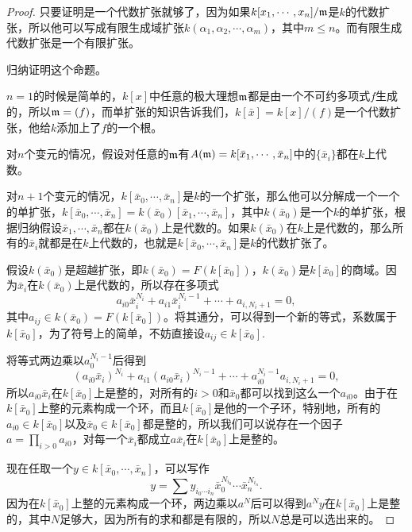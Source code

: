 \documentclass[9pt]{extarticle}
\theoremstyle{plain}%
\begin{document}
\begin{proof}
	只要证明是一个代数扩张就够了，因为如果$k[x_1,\cdots,x_n]/\mathfrak{m}$是$k$的代数扩张，所以他可以写成有限生成域扩张$k(\alpha_1,\alpha_2,\cdots,\alpha_m)$，其中$m\leq n$。而有限生成代数扩张是一个有限扩张。

	归纳证明这个命题。

	$n=1$的时候是简单的，$k[x]$中任意的极大理想$\mathfrak{m}$都是由一个不可约多项式$f$生成的，所以$\mathfrak{m}=(f)$，而单扩张的知识告诉我们，$k[\bar{x}]=k[x]/(f)$是一个代数扩张，他给$k$添加上了$f$的一个根。

	对$n$个变元的情况，假设对任意的$\mathfrak{m}$有$A(\mathfrak{m})=k[\bar{x}_1,\cdots,\bar{x}_n]$中的$\{\bar{x}_i\}$都在$k$上代数。

	对$n+1$个变元的情况，$k[\bar{x}_0,\cdots,\bar{x}_{n}]$是$k$的一个扩张，那么他可以分解成一个一个的单扩张，$k[\bar{x}_0,\cdots,\bar{x}_{n}]=k(\bar{x}_0)[\bar{x}_1,\cdots,\bar{x}_{n}]$，其中$k(\bar{x}_0)$是一个$k$的单扩张，根据归纳假设$\bar{x}_1,\cdots,\bar{x}_{n}$都在$k(\bar{x}_0)$上是代数的。如果$k(\bar{x}_0)$在$k$上是代数的，那么所有的$\bar{x}_i$就都是在$k$上代数的，也就是$k[\bar{x}_0,\cdots,\bar{x}_{n}]$是$k$的代数扩张了。

	假设$k(\bar{x}_0)$是超越扩张，即$k(\bar{x}_0)=F(k[\bar{x}_0])$，$k(\bar{x}_0)$是$k[\bar{x}_0]$的商域。因为$\bar{x}_i$在$k(\bar{x}_0)$上是代数的，所以存在多项式
	\[
		a_{i0}\bar{x}_i^{N_i}+a_{i1}\bar{x}_i^{N_i-1}+\cdots +a_{i,N_i+1}=0,
	\]
	其中$a_{ij}\in k(\bar{x}_0)=F(k[\bar{x}_0])$。将其通分，可以得到一个新的等式，系数属于$k[\bar{x}_0]$，为了符号上的简单，不妨直接设$a_{ij}\in k[\bar{x}_0]$.

	将等式两边乘以$a_0^{N_i-1}$后得到
	\[
		(a_{i0}\bar{x}_i)^{N_i}+a_{i1}(a_{i0}\bar{x}_i)^{N_i-1}+\cdots +a_{i0}^{N_i-1}a_{i,N_i+1}=0,
	\]
	所以$a_{i0}\bar{x}_i$在$k[\bar{x}_0]$上是整的，对所有的$i>0$和$\bar{x}_0$都可以找到这么一个$a_{i0}$。由于在$k[\bar{x}_0]$上整的元素构成一个环，而且$k[\bar{x}_0]$是他的一个子环，特别地，所有的$a_{i0}\in k[\bar{x}_0]$以及$\bar{x}_0\in k[\bar{x}_0]$都是整的，所以我们可以说存在一个因子$a=\prod_{i>0}a_{i0}$，对每一个$\bar{x}_i$都成立$a\bar{x}_i$在$k[\bar{x}_0]$上是整的。

	现在任取一个$y\in k[\bar{x}_0,\cdots,\bar{x}_n]$，可以写作
	\[
		y=\sum y_{i_0 \cdots i_n}\bar{x}_0^{N_{i_0}}\cdots\bar{x}_{n}^{N_{i_n}}.
	\]
	因为在$k[\bar{x}_0]$上整的元素构成一个环，两边乘以$a^N$后可以得到$a^Ny$在$k[\bar{x}_0]$上是整的，其中$N$足够大，因为所有的求和都是有限的，所以$N$总是可以选出来的。


\end{proof}
\end{document}

